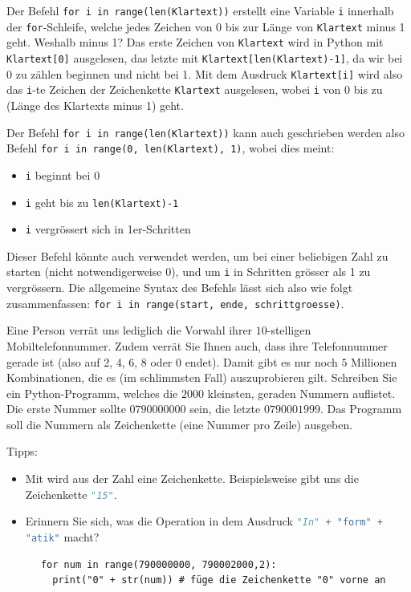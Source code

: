 Der Befehl \lstinline|for i in range(len(Klartext))| erstellt eine Variable \lstinline|i| innerhalb der \lstinline|for|-Schleife, welche jedes Zeichen von 0 bis zur Länge von \lstinline|Klartext| minus 1 geht. Weshalb minus 1? Das erste Zeichen von \lstinline|Klartext| wird in Python mit \lstinline|Klartext[0]| ausgelesen, das letzte mit \lstinline|Klartext[len(Klartext)-1]|, da wir bei 0 zu zählen beginnen und nicht bei 1. Mit dem Ausdruck \lstinline|Klartext[i]| wird also das \lstinline|i|-te Zeichen der Zeichenkette \lstinline|Klartext| ausgelesen, wobei \lstinline|i| von 0 bis zu (Länge des Klartexts minus 1) geht.

Der Befehl \lstinline|for i in range(len(Klartext))| kann auch geschrieben werden also Befehl \lstinline|for i in range(0, len(Klartext), 1)|, wobei dies meint:
\begin{itemize}
	\item \lstinline|i| beginnt bei 0
	\item \lstinline|i| geht bis zu \lstinline|len(Klartext)-1|
	\item \lstinline|i| vergrössert sich in 1er-Schritten
\end{itemize}
Dieser Befehl könnte auch verwendet werden, um bei einer beliebigen Zahl zu starten (nicht notwendigerweise 0), und um \lstinline|i| in Schritten grösser als 1 zu vergrössern. Die allgemeine Syntax des Befehls lässt sich also wie folgt zusammenfassen: \lstinline|for i in range(start, ende, schrittgroesse)|.

\begin{mychallenge}
	Eine Person verrät uns lediglich die Vorwahl ihrer $10$-stelligen Mobiltelefonnummer. Zudem verrät Sie Ihnen auch, dass ihre Telefonnummer gerade ist (also auf 2, 4, 6, 8 oder 0 endet).
	Damit gibt es nur noch $5$ Millionen Kombinationen, die es (im schlimmsten Fall) auszuprobieren gilt.
	Schreiben Sie ein Python-Programm, welches die $2000$ kleinsten, geraden Nummern auflistet.
	Die erste Nummer sollte $0790000000$ sein, die letzte $0790001999$.
	Das Programm soll die Nummern als Zeichenkette (eine Nummer pro Zeile) ausgeben.

	Tipps:
	\begin{itemize}
		\item Mit 
		      wird aus der Zahl  eine Zeichenkette.
		      Beispielsweise gibt uns 
		      die Zeichenkette \lstinline[language=Python,basicstyle=\ttfamily\normalsize]!"15"!.
		\item Erinnern Sie sich, was die Operation \pythoninline{+} in dem Ausdruck \lstinline[language=Python,basicstyle=\ttfamily\normalsize]!"In" + "form" + "atik"! macht?
	\end{itemize}
	\begin{myanswer}
		\begin{lstlisting}
      for num in range(790000000, 790002000,2):
        print("0" + str(num)) # füge die Zeichenkette "0" vorne an
    \end{lstlisting}
	\end{myanswer}
\end{mychallenge}


